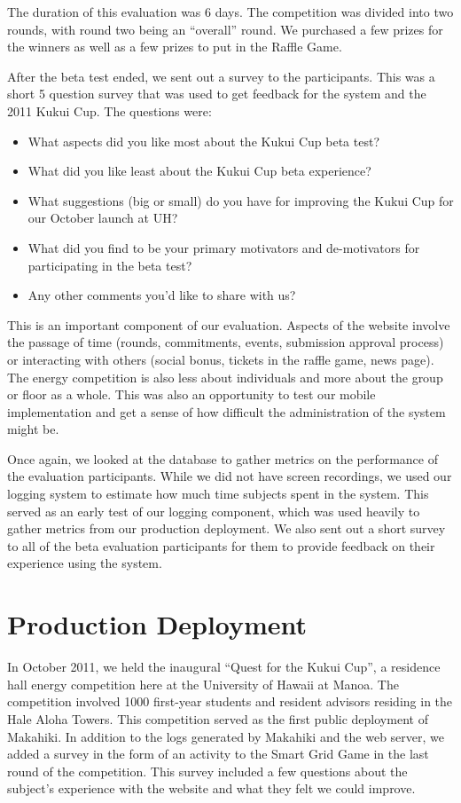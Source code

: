 The duration of this evaluation was 6 days. The competition was divided into two rounds, with round two being an ``overall'' round. We purchased a few prizes for the winners as well as a few prizes to put in the Raffle Game.

After the beta test ended, we sent out a survey to the participants. This was a short 5 question survey that was used to get feedback for the system and the 2011 Kukui Cup. The questions were:

\begin{itemize}
  \item What aspects did you like most about the Kukui Cup beta test?
  \item What did you like least about the Kukui Cup beta experience?
  \item What suggestions (big or small) do you have for improving the Kukui Cup for our October launch at UH?
  \item What did you find to be your primary motivators and de-motivators for participating in the beta test?
  \item Any other comments you'd like to share with us?
\end{itemize}

This is an important component of our evaluation. Aspects of the website involve the passage of time (rounds, commitments, events, submission approval process) or interacting with others (social bonus, tickets in the raffle game, news page). The energy competition is also less about individuals and more about the group or floor as a whole. This was also an opportunity to test our mobile implementation and get a sense of how difficult the administration of the system might be.

Once again, we looked at the database to gather metrics on the performance of the evaluation participants. While we did not have screen recordings, we used our logging system to estimate how much time subjects spent in the system. This served as an early test of our logging component, which was used heavily to gather metrics from our production deployment. We also sent out a short survey to all of the beta evaluation participants for them to provide feedback on their experience using the system.

\section{Production Deployment}

In October 2011, we held the inaugural ``Quest for the Kukui Cup'', a residence hall energy competition here at the University of Hawaii at Manoa. The competition involved 1000 first-year students and resident advisors residing in the Hale Aloha Towers. This competition served as the first public deployment of Makahiki. In addition to the logs generated by Makahiki and the web server, we added a survey in the form of an activity to the Smart Grid Game in the last round of the competition. This survey included a few questions about the subject's experience with the website and what they felt we could improve.

